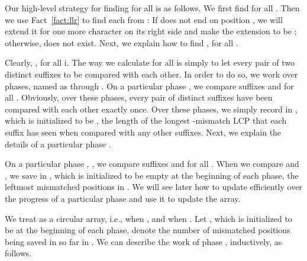 \documentclass[11pt]{llncs}
\begin{document}
Our high-level strategy for finding  for all  is as
follows.  We first find  for all . Then we use
Fact~\ref{fact:llr} to find each  from : If
 does not end on position , we will extend it 
for one more character on its right side and make the extension to be
; otherwise,  does not exist. Next, we 
explain how to find , for all . 

Clearly, , for all
i. The way we calculate  for all  is simply to let
every pair of two distinct suffixes to be compared with each other. In
order to do so, we work over  phases, named as 
through . On a particular phase
, we compare suffixes  and  for
all . Obviously, over these  phases,
every pair of distinct suffixes have been compared with each other
exactly once. 
Over these  phases, we simply record in , which is
initialized to be , the length of 
the longest -mismatch LCP that each suffix 
has seen when compared with any other suffixes. 
Next, we explain the details of a particular phase
.

On a particular phase , , we
compare suffixes  and  for all
. When we compare  and ,
we save in , which is initialized to be empty at the
beginning of each phase, the leftmost mismatched  positions in
. We will see later how to update  efficiently
over the progress of a particular phase and use it to update the 
array. 

We treat  as a circular array,
i.e.,  when , and  when . Let , which is initialized to be  at the beginning of each
phase, denote the number of mismatched positions being saved in
 so far in . We can describe the
work of phase , inductively, as follows.
\end{document}
